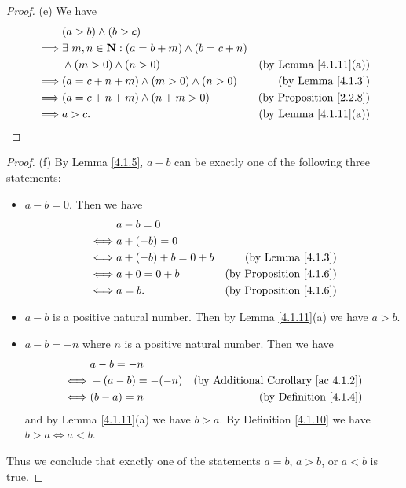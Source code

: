 \begin{proof}{(e)}
    We have
    \begin{align*}
                 & (a > b) \land (b > c)                                                                              \\
        \implies & \exists\ m, n \in \mathbf{N} : (a = b + m) \land (b = c + n)                                       \\
                 & \land (m > 0) \land (n > 0)                                  & \text{(by Lemma \ref{4.1.11}(a))}   \\
        \implies & (a = c + n + m) \land (m > 0) \land (n > 0)                  & \text{(by Lemma \ref{4.1.3})}       \\
        \implies & (a = c + n + m) \land (n + m > 0)                            & \text{(by Proposition \ref{2.2.8})} \\
        \implies & a > c.                                                       & \text{(by Lemma \ref{4.1.11}(a))}
    \end{align*}
\end{proof}

\begin{proof}{(f)}
    By Lemma \ref{4.1.5}, \(a - b\) can be exactly one of the following three statements:
    \begin{itemize}
        \item \(a - b = 0\).
              Then we have
              \begin{align*}
                       & a - b = 0                                                  \\
                  \iff & a + (-b) = 0                                               \\
                  \iff & a + (-b) + b = 0 + b & \text{(by Lemma \ref{4.1.3})}       \\
                  \iff & a + 0 = 0 + b        & \text{(by Proposition \ref{4.1.6})} \\
                  \iff & a = b.               & \text{(by Proposition \ref{4.1.6})}
              \end{align*}
        \item \(a - b\) is a positive natural number.
              Then by Lemma \ref{4.1.11}(a) we have \(a > b\).
        \item \(a - b = -n\) where \(n\) is a positive natural number.
              Then we have
              \begin{align*}
                       & a - b = -n                                                         \\
                  \iff & -(a - b) = -(-n) & \text{(by Additional Corollary \ref{ac 4.1.2})} \\
                  \iff & (b - a) = n      & \text{(by Definition \ref{4.1.4})}
              \end{align*}
              and by Lemma \ref{4.1.11}(a) we have \(b > a\).
              By Definition \ref{4.1.10} we have \(b > a \iff a < b\).
    \end{itemize}
    Thus we conclude that exactly one of the statements \(a = b\), \(a > b\), or \(a < b\) is true.
\end{proof}

